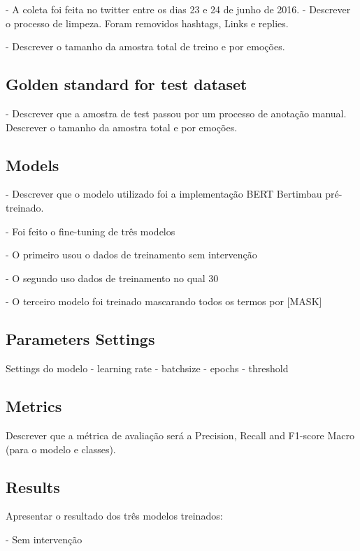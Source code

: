 \documentclass[12pt]{article}
\begin{document}
- A coleta foi feita no twitter entre os dias 23 e 24 de junho de 2016.
- Descrever o processo de limpeza. Foram removidos hashtags, Links e replies.

- Descrever o tamanho da amostra total de treino e por emoções.

\subsection{Golden standard for test dataset}

- Descrever que a amostra de test passou por um processo de anotação manual. Descrever o tamanho da amostra total e por emoções.



\subsection{Models}
- Descrever que o modelo utilizado foi a implementação BERT Bertimbau pré-treinado.

- Foi feito o fine-tuning de três modelos

- O primeiro usou o dados de treinamento sem intervenção

- O segundo uso dados de treinamento no qual 30%

- O terceiro modelo foi treinado mascarando todos os termos por [MASK]

\subsection{Parameters Settings}
Settings do modelo
- learning rate
- batchsize
- epochs
- threshold

\subsection{Metrics}
Descrever que a métrica de avaliação será a Precision, Recall and F1-score Macro (para o modelo e classes).

\subsection{Results}
Apresentar o resultado dos três modelos treinados:

- Sem intervenção
\end{document}
